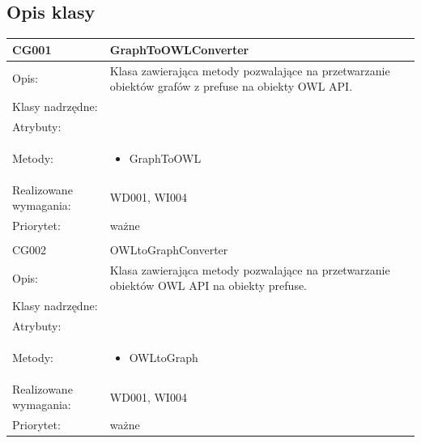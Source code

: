 \documentclass[a4paper,10pt]{article}
\begin{document}

\subsection{Opis klasy}

\begin{center}
 


\begin{longtable}{|m{3cm}|m{9cm}|} \hline

CG001 & GraphToOWLConverter \\ \hline
Opis: & Klasa zawierająca metody pozwalające na przetwarzanie obiektów grafów z prefuse na obiekty OWL API. \\ \hline
Klasy nadrzędne: &     \\ \hline
Atrybuty: & %
 \\ \hline
Metody: & \begin{itemize}
 \item GraphToOWL
\end{itemize}
  \\ \hline
Realizowane wymagania: & WD001, WI004 \\ \hline
Priorytet: & ważne  \\ \hline

\multicolumn{2}{c}{} \\
 \hline

CG002 & OWLtoGraphConverter \\ \hline
Opis: & Klasa zawierająca metody pozwalające na przetwarzanie obiektów OWL API na obiekty prefuse. \\ \hline
Klasy nadrzędne: &     \\ \hline
Atrybuty: & %
 \\ \hline
Metody: & \begin{itemize}
 \item OWLtoGraph
\end{itemize}
  \\ \hline
Realizowane wymagania: & WD001, WI004 \\ \hline
Priorytet: & ważne  \\ \hline


\end{longtable}
\end{center}
\end{document}
